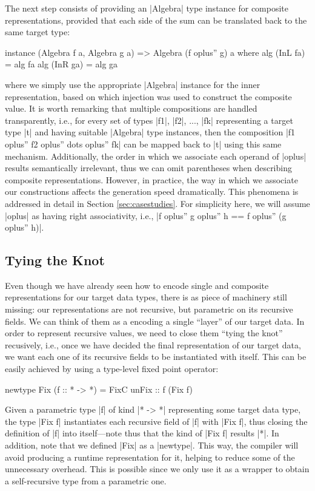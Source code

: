 The next step consists of providing an |Algebra| type instance for composite
representations, provided that each side of the sum can be translated back to
the same target type:

\begin{code}
instance (Algebra f a, Algebra g a) => Algebra (f oplus'' g) a
  where  alg (InL fa) = alg fa
         alg (InR ga) = alg ga
\end{code}
%
where we simply use the appropriate |Algebra| instance for the inner
representation, based on which injection was used to construct the composite
value.
%
It is worth remarking that multiple compositions are handled transparently,
i.e., for every set of types |f1|, |f2|, ..., |fk| representing a target type
|t| and having suitable |Algebra| type instances, then the composition |f1
oplus'' f2 oplus'' dots oplus'' fk| can be mapped back to |t| using this same
mechanism.
%
Additionally, the order in which we associate each operand of |oplus| results
semantically irrelevant, thus we can omit parentheses when describing composite
representations.
%
However, in practice, the way in which we associate our constructions affects
the generation speed dramatically.
%
This phenomena is addressed in detail in Section \ref{sec:casestudies}.
%
For simplicity here, we will assume |oplus| as having right associativity, i.e.,
|f oplus'' g oplus'' h == f oplus'' (g oplus'' h)|.


%
\subsection{Tying the Knot}

Even though we have already seen how to encode single and composite
representations for our target data types, there is as piece of machinery still
missing: our representations are not recursive, but parametric on its recursive
fields.
%
We can think of them as a encoding a single ``layer'' of our target data.
%
In order to represent recursive values, we need to close them ``tying the knot''
recusively, i.e., once we have decided the final representation of our target
data, we want each one of its recursive fields to be instantiated with itself.
%
This can be easily achieved by using a type-level fixed point operator:

\begin{code}
newtype Fix (f :: * -> *) = FixC { unFix :: f (Fix f) }
\end{code}
%
Given a parametric type |f| of kind |* -> *| representing some target data type,
the type |Fix f| instantiates each recursive field of |f| with |Fix f|, thus
closing the definition of |f| into itself---note thus that the kind of |Fix f|
results |*|.
%
In addition, note that we defined |Fix| as a |newtype|.
%
This way, the compiler will avoid producing a runtime representation for it,
helping to reduce some of the unnecessary overhead.
%
This is possible since we only use it as a wrapper to obtain a self-recursive
type from a parametric one.


